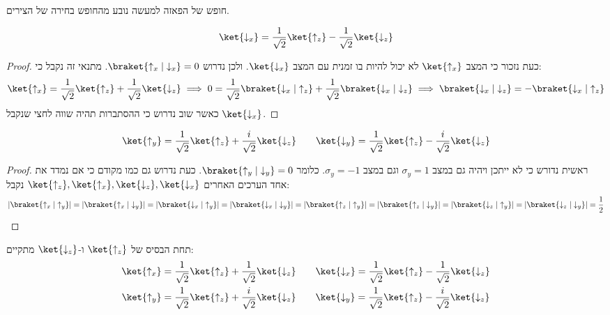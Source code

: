 \documentclass{tstextbook}
\begin{document}
\begin{remark}
חופש של הפאזה למעשה נובע מהחופש בחירה של הצירים.

\end{remark}
\begin{proposition}
$$\ket{\downarrow_{x}} = \frac{1}{\sqrt{ 2 }}\ket{\uparrow_{z}} -\frac{1}{\sqrt{ 2 }}\ket{\downarrow_{z}} $$

\end{proposition}
\begin{proof}
כעת נזכור כי המצב \(\ket{\uparrow_{x}}\) לא יכול להיות בו זמנית עם המצב \(\ket{\downarrow_{x}}\). ולכן נדרוש \(\braket{ \uparrow_{x} | \downarrow_{x} }=0\). מתנאי זה נקבל כי:
$$\ket{\uparrow_{x}} = \frac{1}{\sqrt{ 2 }}\ket{\uparrow_{z}} +\frac{1}{\sqrt{ 2 }}\ket{\downarrow_{z}} \implies 0 = \frac{1}{\sqrt{ 2 }}\braket{ \downarrow_{x} |\uparrow_{z}  }+\frac{1}{\sqrt{ 2 }}\braket{ \downarrow_{x} | \downarrow_{z} }\implies   \braket{ \downarrow_{x} | \downarrow_{z} } = - \braket{ \downarrow_{x} | \uparrow_{z} }$$
כאשר שוב נדרוש כי ההסתברות תהיה שווה לחצי שנקבל \(\ket{\downarrow_{x}}\). 

\end{proof}
\begin{proposition}
$$
\ket{\uparrow_{y}} = \frac{1}{\sqrt{ 2 }}\ket{\uparrow_{z}} +\frac{i}{\sqrt{ 2 }}\ket{\downarrow_{z}} \qquad \ket{\downarrow_{y}} = \frac{1}{\sqrt{ 2 }}\ket{\uparrow_{z}} -\frac{i}{\sqrt{ 2 }}\ket{\downarrow_{z}} $$

\end{proposition}
\begin{proof}
ראשית נדורש כי לא ייתכן ויהיה גם במצב \(\sigma_{y}=1\) וגם במצב \(\sigma_{y}=-1\). כלומר \(\braket{ \uparrow_{y} | \downarrow_{y} }=0\).
כעת נדרוש גם כמו מקודם כי אם נמדד את אחד הערכים האחרים \(\ket{\uparrow_{z}},\ket{\uparrow_{x}},\ket{\downarrow_{z}},\ket{\downarrow_{x}}\) נקבל:
$$\left\lvert  \braket{ \uparrow_{x} | \uparrow_{y} }   \right\rvert =\left\lvert  \braket{ \uparrow_{x} | \downarrow_{y} }   \right\rvert =\left\lvert  \braket{ \downarrow_{x} | \uparrow_{y} }   \right\rvert =\left\lvert  \braket{ \downarrow_{x} | \downarrow_{y} }   \right\rvert =\left\lvert  \braket{ \uparrow_{z} | \uparrow_{y} }   \right\rvert =\left\lvert  \braket{ \uparrow_{z} | \downarrow_{y} }   \right\rvert =\left\lvert  \braket{ \downarrow_{z} | \uparrow_{y} }   \right\rvert =\left\lvert  \braket{ \downarrow_{z} | \downarrow_{y} }   \right\rvert=\frac{1}{2}$$

\end{proof}
\begin{corollary}
תחת הבסיס של \(\ket{\uparrow_{z}}\) ו-\(\ket{\downarrow_{z}}\) מתקיים:
$$\begin{gather}\ket{\uparrow_{x}} = \frac{1}{\sqrt{ 2 }}\ket{\uparrow_{z}} +\frac{1}{\sqrt{ 2 }}\ket{\downarrow_{z}}  \qquad \ket{\downarrow_{x}} = \frac{1}{\sqrt{ 2 }}\ket{\uparrow_{z}} -\frac{1}{\sqrt{ 2 }}\ket{\downarrow_{z}}  \\\ket{\uparrow_{y}} = \frac{1}{\sqrt{ 2 }}\ket{\uparrow_{z}} +\frac{i}{\sqrt{ 2 }}\ket{\downarrow_{z}} \qquad \ket{\downarrow_{y}} = \frac{1}{\sqrt{ 2 }}\ket{\uparrow_{z}} -\frac{i}{\sqrt{ 2 }}\ket{\downarrow_{z}} 
\end{gather}$$

\end{corollary}
\end{document}
